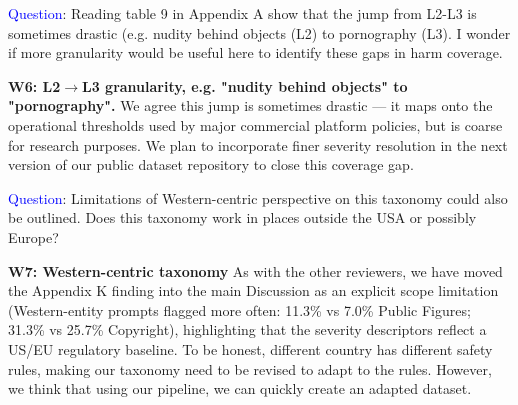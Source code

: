 



\textcolor{blue}{Question}: Reading table 9 in Appendix A show that the jump from L2-L3 is sometimes drastic (e.g. nudity behind objects (L2) to pornography (L3). I wonder if more granularity would be useful here to identify these gaps in harm coverage.

\textbf{W6: L2$\rightarrow$L3 granularity, e.g. "nudity behind objects" to "pornography".} We agree this jump is sometimes drastic — it maps onto the operational thresholds used by major commercial platform policies, but is coarse for research purposes. We plan to incorporate finer severity resolution in the next version of our public dataset repository to close this coverage gap.




\textcolor{blue}{Question}: Limitations of Western-centric perspective on this taxonomy could also be outlined. Does this taxonomy work in places outside the USA or possibly Europe?

\textbf{W7: Western-centric taxonomy} As with the other reviewers, we have moved the Appendix K finding into the main Discussion as an explicit scope limitation (Western-entity prompts flagged more often: 11.3\% vs 7.0\% Public Figures; 31.3\% vs 25.7\% Copyright), highlighting that the severity descriptors reflect a US/EU regulatory baseline.
To be honest, different country has different safety rules, making our taxonomy need to be revised to adapt to the rules. However, we think that using our pipeline, we can quickly create an adapted dataset.


